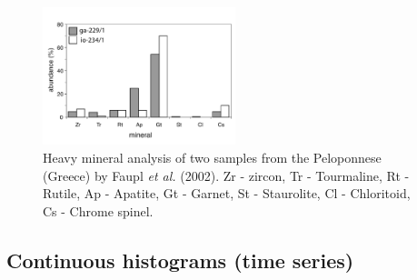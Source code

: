 \documentclass{article}
\begin{document}
\begin{figure}[h]
  \centering
  \includegraphics[width=0.5\textwidth]{heavyMinerals1.pdf}
  \caption{
Heavy mineral analysis of two samples from the Peloponnese (Greece) by
Faupl {\it et al.} (2002).  Zr - zircon, Tr - Tourmaline, Rt - Rutile,
Ap -  Apatite, Gt  - Garnet, St  - Staurolite,  Cl - Chloritoid,  Cs -
Chrome spinel.}
  \label{fig:heavyminerals1}
\end{figure}

\subsection{Continuous  histograms (time series)}  \label{sec:continous}
\end{document}
